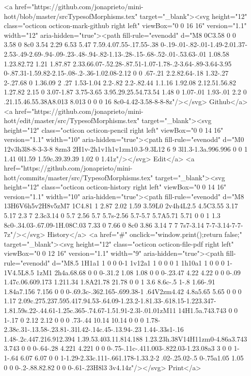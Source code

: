       <a href="https://github.com/jonaprieto/mini-hott/blob/master/srcTypesofMorphisms.tex" target="_blank"><svg height="12" class="octicon octicon-mark-github right left" viewBox="0 0 16 16" version="1.1" width="12" aria-hidden="true"><path fill-rule="evenodd" d="M8 0C3.58 0 0 3.58 0 8c0 3.54 2.29 6.53 5.47 7.59.4.07.55-.17.55-.38 0-.19-.01-.82-.01-1.49-2.01.37-2.53-.49-2.69-.94-.09-.23-.48-.94-.82-1.13-.28-.15-.68-.52-.01-.53.63-.01 1.08.58 1.23.82.72 1.21 1.87.87 2.33.66.07-.52.28-.87.51-1.07-1.78-.2-3.64-.89-3.64-3.95 0-.87.31-1.59.82-2.15-.08-.2-.36-1.02.08-2.12 0 0 .67-.21 2.2.82.64-.18 1.32-.27 2-.27.68 0 1.36.09 2 .27 1.53-1.04 2.2-.82 2.2-.82.44 1.1.16 1.92.08 2.12.51.56.82 1.27.82 2.15 0 3.07-1.87 3.75-3.65 3.95.29.25.54.73.54 1.48 0 1.07-.01 1.93-.01 2.2 0 .21.15.46.55.38A8.013 8.013 0 0 0 16 8c0-4.42-3.58-8-8-8z"/></svg> Github</a>
      <a href="https://github.com/jonaprieto/mini-hott/edit/master/src/TypesofMorphisms.tex" target="_blank"><svg height="12" class="octicon octicon-pencil right left" viewBox="0 0 14 16" version="1.1" width="10" aria-hidden="true"><path fill-rule="evenodd" d="M0 12v3h3l8-8-3-3-8 8zm3 2H1v-2h1v1h1v1zm10.3-9.3L12 6 9 3l1.3-1.3a.996.996 0 0 1 1.41 0l1.59 1.59c.39.39.39 1.02 0 1.41z"/></svg> Edit</a>
      <a href="https://github.com/jonaprieto/mini-hott/commits/master/src/TypesofMorphisms.tex" target="_blank"><svg height="12" class="octicon octicon-history right left" viewBox="0 0 14 16" version="1.1" width="10" aria-hidden="true"><path fill-rule="evenodd" d="M8 13H6V6h5v2H8v5zM7 1C4.81 1 2.87 2.02 1.59 3.59L0 2v4h4L2.5 4.5C3.55 3.17 5.17 2.3 7 2.3c3.14 0 5.7 2.56 5.7 5.7s-2.56 5.7-5.7 5.7A5.71 5.71 0 0 1 1.3 8c0-.34.03-.67.09-1H.08C.03 7.33 0 7.66 0 8c0 3.86 3.14 7 7 7s7-3.14 7-7-3.14-7-7-7z"/></svg> History</a>
      <a  href="#" onclick="window.print();return false;" target="_blank"><svg height="12" class="octicon octicon-file-pdf right left" viewBox="0 0 12 16" version="1.1" width="9" aria-hidden="true"><path fill-rule="evenodd" d="M8.5 1H1a1 1 0 0 0-1 1v12a1 1 0 0 0 1 1h10a1 1 0 0 0 1-1V4.5L8.5 1zM1 2h4a.68.68 0 0 0-.31.2 1.08 1.08 0 0 0-.23.47 4.22 4.22 0 0 0-.09 1.47c.06.609.173 1.211.34 1.8A21.78 21.78 0 0 1 3.6 8.6c-.5 1-.8 1.66-.91 1.84a7.156 7.156 0 0 0-.69.3c-.362.165-.699.38-1 .64V2zm4.42 4.8a5.65 5.65 0 0 0 1.17 2.09c.275.237.595.417.94.53-.64.09-1.23.2-1.81.33-.618.15-1.223.347-1.81.59s.22-.44.61-1.25c.365-.74.67-1.51.91-2.3l-.01.01zM11 14H1.5a.743.743 0 0 1-.17 0 2.12 2.12 0 0 0 .73-.44 10.14 10.14 0 0 0 1.78-2.38c.31-.13.58-.23.81-.31l.42-.14c.45-.13.94-.23 1.44-.33s1-.16 1.48-.2c.447.216.912.394 1.39.53.403.11.814.188 1.23.23h.38V14H11zm0-4.86a3.743 3.743 0 0 0-.64-.28 4.221 4.221 0 0 0-.75-.11c-.411.003-.822.03-1.23.08a3 3 0 0 1-1-.64 6.07 6.07 0 0 1-1.29-2.33c.111-.661.178-1.33.2-2 .02-.25.02-.5 0-.75a1.05 1.05 0 0 0-.2-.88.82.82 0 0 0-.61-.23H8l3 3v4.14z"/></svg> Print</a>
